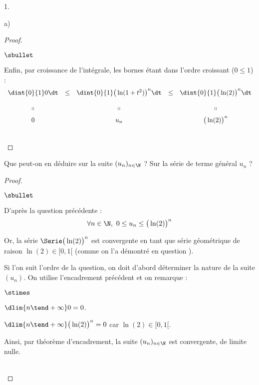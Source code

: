 \documentclass[11pt]{article}%
\begin{document}
\begin{noliste}{1.}
\begin{noliste}{a)}
\begin{proof}
\begin{noliste}{$\sbullet$}
        \newpage


      \item Enfin, par croissance de l'intégrale, les bornes étant
        dans l'ordre croissant ($0 \leq 1$) : 
        \[
        \begin{array}{ccccc}
          \dint{0}{1} 0 \dt & \leq & \dint{0}{1} \big( \ln(1 + t^2)
          \big)^n \dt & \leq & \dint{0}{1} \big( \ln(2) \big)^n \dt 
          \\[.4cm]
          \shortparallel & & \shortparallel & & \shortparallel
          \\[.2cm]
          0 & & u_n & & \big(\ln(2) \big)^n
        \end{array}
        \]
      \end{noliste}
      ~\\[-1cm] 
    \end{proof}

  \item Que peut-on en déduire sur la suite $(u_n)_{n \in \N}$ ? Sur
    la série de terme général $u_n$ ?

    \begin{proof}~%
      \begin{noliste}{$\sbullet$}
      \item D'après la question précédente : 
        \[
        \forall n \in \N, \ 0 \leq u_n \leq \big(\ln(2) \big)^n
        \]

      \item Or, la série $\Serie \big(\ln(2) \big)^n$ est convergente
        en tant que série géométrique de raison $\ln(2) \in [0, 1[$
        (comme on l'a démontré en question ).
      \end{noliste}
      \begin{remark}
        Si l'on suit l'ordre de la question, on doit d'abord
        déterminer la nature de la suite $(u_n)$. On utilise
        l'encadrement précédent et on remarque :
        \begin{noliste}{$\stimes$}
        \item $\dlim{n \tend +\infty} 0 = 0$.
        \item $\dlim{n \tend +\infty} \big( \ln(2) \big)^n = 0$ car
          $\ln(2) \in [0, 1[$.
        \end{noliste}
        Ainsi, par théorème d'encadrement, la suite $(u_n)_{n \in \N}$
        est convergente, de limite nulle.
      \end{remark}~\\[-1.4cm]
    \end{proof}
  \end{noliste}  


\end{noliste}
\end{document}
